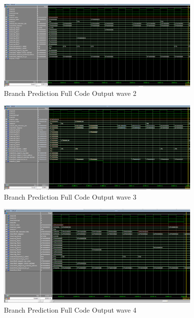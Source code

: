 \begin{figure}[H]
    \centering
    \includegraphics[width=0.9\textwidth]{images/test_cases/branch_prediction/BranchPrediction_regular_21.PNG}
    \caption{Branch Prediction Full Code Output wave 2}
    \label{fig:brp_reg_2}
\end{figure}

\begin{figure}[H]
    \centering
    \includegraphics[width=0.9\textwidth]{images/test_cases/branch_prediction/BranchPrediction_regular_22.PNG}
    \caption{Branch Prediction Full Code Output wave 3}
    \label{fig:brp_reg_3}
\end{figure}

\begin{figure}[H]
    \centering
    \includegraphics[width=0.9\textwidth]{images/test_cases/branch_prediction/BranchPrediction_regular_23.PNG}
    \caption{Branch Prediction Full Code Output wave 4}
    \label{fig:brp_reg_4}
\end{figure}

